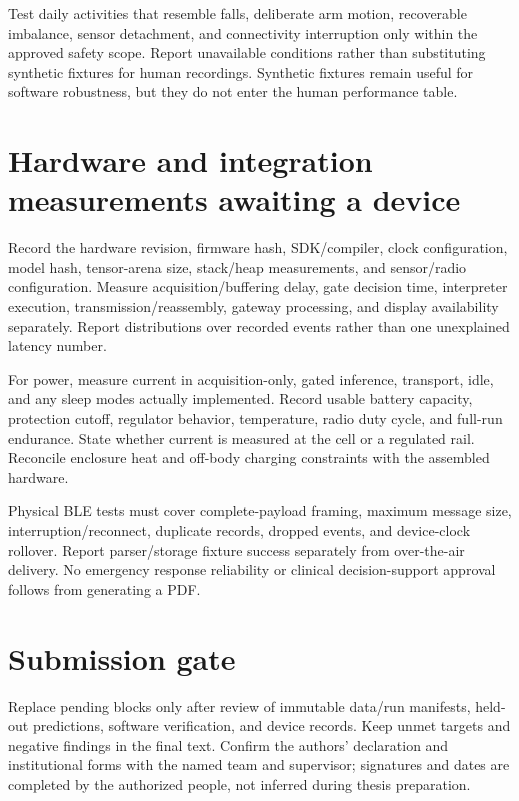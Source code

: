 Test daily activities that resemble falls, deliberate arm motion, recoverable imbalance, sensor detachment, and connectivity interruption only within the approved safety scope. Report unavailable conditions rather than substituting synthetic fixtures for human recordings. Synthetic fixtures remain useful for software robustness, but they do not enter the human performance table.

\section{Hardware and integration measurements awaiting a device}

Record the hardware revision, firmware hash, SDK/compiler, clock configuration, model hash, tensor-arena size, stack/heap measurements, and sensor/radio configuration. Measure acquisition/buffering delay, gate decision time, interpreter execution, transmission/reassembly, gateway processing, and display availability separately. Report distributions over recorded events rather than one unexplained latency number.

For power, measure current in acquisition-only, gated inference, transport, idle, and any sleep modes actually implemented. Record usable battery capacity, protection cutoff, regulator behavior, temperature, radio duty cycle, and full-run endurance. State whether current is measured at the cell or a regulated rail. Reconcile enclosure heat and off-body charging constraints with the assembled hardware.

Physical BLE tests must cover complete-payload framing, maximum message size, interruption/reconnect, duplicate records, dropped events, and device-clock rollover. Report parser/storage fixture success separately from over-the-air delivery. No emergency response reliability or clinical decision-support approval follows from generating a PDF.

\section{Submission gate}
Replace pending blocks only after review of immutable data/run manifests, held-out predictions, software verification, and device records. Keep unmet targets and negative findings in the final text. Confirm the authors' declaration and institutional forms with the named team and supervisor; signatures and dates are completed by the authorized people, not inferred during thesis preparation.
